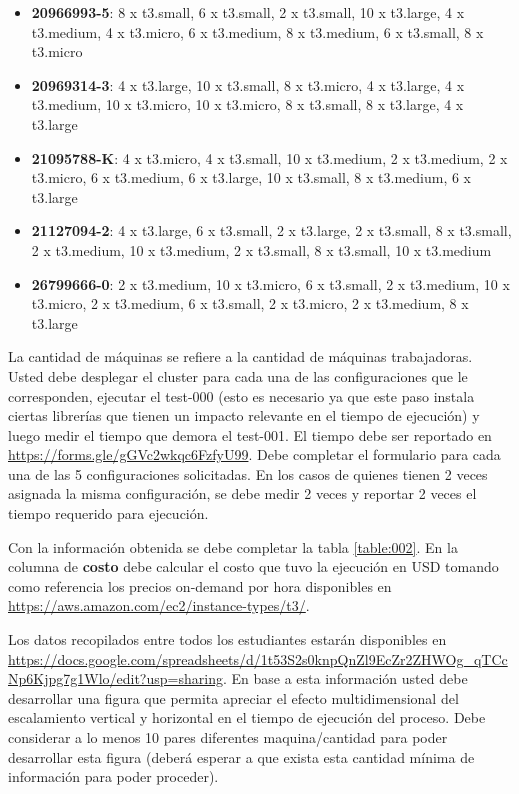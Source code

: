 \documentclass[12pt,letterpaper,twoside]{article}
\begin{document}
{\begin{itemize}
        \item \textbf{20966993-5}: 8 x t3.small, 6 x t3.small, 2 x t3.small, 10 x t3.large, 4 x t3.medium, 4 x t3.micro, 6 x t3.medium, 8 x t3.medium, 6 x t3.small, 8 x t3.micro
        \item \textbf{20969314-3}: 4 x t3.large, 10 x t3.small, 8 x t3.micro, 4 x t3.large, 4 x t3.medium, 10 x t3.micro, 10 x t3.micro, 8 x t3.small, 8 x t3.large, 4 x t3.large
        \item \textbf{21095788-K}: 4 x t3.micro, 4 x t3.small, 10 x t3.medium, 2 x t3.medium, 2 x t3.micro, 6 x t3.medium, 6 x t3.large, 10 x t3.small, 8 x t3.medium, 6 x t3.large
        \item \textbf{21127094-2}: 4 x t3.large, 6 x t3.small, 2 x t3.large, 2 x t3.small, 8 x t3.small, 2 x t3.medium, 10 x t3.medium, 2 x t3.small, 8 x t3.small, 10 x t3.medium
        \item \textbf{26799666-0}: 2 x t3.medium, 10 x t3.micro, 6 x t3.small, 2 x t3.medium, 10 x t3.micro, 2 x t3.medium, 6 x t3.small, 2 x t3.micro, 2 x t3.medium, 8 x t3.large
    \end{itemize}

    La cantidad de máquinas se refiere a la cantidad de máquinas trabajadoras. Usted debe desplegar el cluster para cada una de las configuraciones que le corresponden, ejecutar el test-000 (esto es necesario ya que este paso instala ciertas librerías que tienen un impacto relevante en el tiempo de ejecución) y luego medir el tiempo que demora el test-001. El tiempo debe ser reportado en \url{https://forms.gle/gGVc2wkqc6FzfyU99}. Debe completar el formulario para cada una de las 5 configuraciones solicitadas. En los casos de quienes tienen 2 veces asignada la misma configuración, se debe medir 2 veces y reportar 2 veces el tiempo requerido para ejecución.

    Con la información obtenida se debe completar la tabla \ref{table:002}. En la columna de \textbf{costo} debe calcular el costo que tuvo la ejecución en USD tomando como referencia los precios on-demand por hora disponibles en \url{https://aws.amazon.com/ec2/instance-types/t3/}.

    Los datos recopilados entre todos los estudiantes estarán disponibles en \url{https://docs.google.com/spreadsheets/d/1t53S2s0knpQnZl9EcZr2ZHWOg_qTCcNp6Kjpg7g1Wlo/edit?usp=sharing}. En base a esta información usted debe desarrollar una figura que permita apreciar el efecto multidimensional del escalamiento vertical y horizontal en el tiempo de ejecución del proceso. Debe considerar a lo menos 10 pares diferentes maquina/cantidad para poder desarrollar esta figura (deberá esperar a que exista esta cantidad mínima de información para poder proceder).
}
\end{document}
